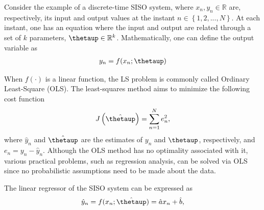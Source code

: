 \documentclass[english]{sobraep}
\begin{document}
Consider the example of a discrete-time SISO system, where $x_n, y_n \in \mathbb{R}$ are, respectively, its input and output values at the instant $n \in \left\{1,2,...,N\right\}$. At each instant, one has an equation where the input and output are related through a set of \(k\) parameters, $\boldsymbol{\thetaup} \in \mathbb{R}^k$. Mathematically, one can define the output variable as
\begin{align}
    y_n = f(x_n;\boldsymbol{\thetaup})
\end{align}

When $f(\cdot)$ is a linear function, the LS problem is commonly called Ordinary Least-Square (OLS). The least-squares method aims to minimize the following cost function
\begin{align}
    J\left( \hat{\boldsymbol{\thetaup}} \right) = \sum_{n=1}^{N} e_n^2,
\end{align}
where \(\hat{y}_n\) and \(\hat{\boldsymbol{\thetaup}}\) are the estimates of \(y_n\) and \(\boldsymbol{\thetaup}\), respectively, and \(e_n = y_n - \hat{y}_n\). Although the OLS method has no optimality associated with it, various practical problems, such as regression analysis, can be solved via OLS since no probabilistic assumptions need to be made about the data.

The linear regressor of the SISO system can be expressed as
\begin{align}
    \label{eq:y_n}
    \hat{y}_n = f(x_n;\hat{\boldsymbol{\thetaup}}) = \hat{a}x_n + \hat{b},
\end{align}
\end{document}
